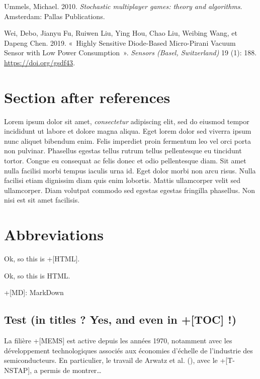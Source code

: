 \documentclass[
]{article}
\newlength{\cslhangindent}
\newenvironment{CSLReferences}[2] %
 {\begin{list}{}{%
  \setlength{\itemindent}{0pt}
  \setlength{\leftmargin}{0pt}
  \setlength{\parsep}{0pt}
  \ifodd #1
   \setlength{\leftmargin}{\cslhangindent}
   \setlength{\itemindent}{-1\cslhangindent}
  \fi
  \setlength{\itemsep}{#2\baselineskip}}}
 {\end{list}}
\begin{document}
\begin{CSLReferences}{1}{0}
Ummels, Michael. 2010. \emph{Stochastic multiplayer games: theory and
algorithms}. Amsterdam: Pallas Publications.

Wei, Debo, Jianyu Fu, Ruiwen Liu, Ying Hou, Chao Liu, Weibing Wang, et
Dapeng Chen. 2019. {«~Highly Sensitive Diode-Based Micro-Pirani Vacuum
Sensor with Low Power Consumption~»}. \emph{Sensors (Basel,
Switzerland)} 19 (1): 188. \url{https://doi.org/gsdf43}.

\end{CSLReferences}

\label{abbr}

\section{Section after references}\label{section-after-references}

Lorem ipsum dolor sit amet, \emph{consectetur} adipiscing elit, sed do
eiusmod tempor incididunt ut labore et dolore magna aliqua. Eget lorem
dolor sed viverra ipsum nunc aliquet bibendum enim. Felis imperdiet
proin fermentum leo vel orci porta non pulvinar. Phasellus egestas
tellus rutrum tellus pellentesque eu tincidunt tortor. Congue eu
consequat ac felis donec et odio pellentesque diam. Sit amet nulla
facilisi morbi tempus iaculis urna id. Eget dolor morbi non arcu risus.
Nulla facilisi etiam dignissim diam quis enim lobortis. Mattis
ullamcorper velit sed ullamcorper. Diam volutpat commodo sed egestas
egestas fringilla phasellus. Non nisi est sit amet facilisis.

\section{Abbreviations}\label{abbreviations}

Ok, so this is +{[}HTML{]}.

Ok, so this is HTML.

+{[}MD{]}: MarkDown

\subsection{Test (in titles ? Yes, and even in +{[}TOC{]}
!)}\label{test-in-titles-yes-and-even-in-toc}

La filière +{[}MEMS{]} est active depuis les années 1970, notamment avec
les développement technologiques associés aux économies d'échelle de
l'industrie des semiconducteurs. En particulier, le travail de Arwatz et
al.
(),
avec le +{[}T-NSTAP{]}, a permis de montrer\ldots{}
\end{document}
